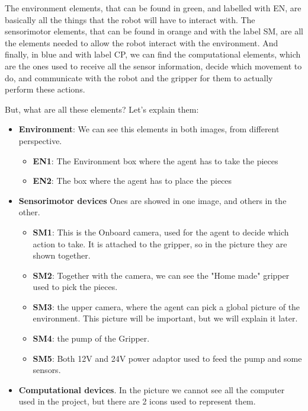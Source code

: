 		
		The environment elements, that can be found in green, and labelled with EN, are basically all the things that the robot will have to interact with. The sensorimotor elements, that can be found in orange and with the label SM, are all the elements needed to allow the robot interact with the environment. And finally, in blue and with label CP, we can find the computational elements, which are the ones used to receive all the sensor information, decide which movement to do, and communicate with the robot and the gripper for them to actually perform these actions.
		
		But, what are all these elements? Let's explain them:
		
		\begin{itemize}
			\item[\textendash]\textbf{Environment}: We can see this elements in both images, from different perspective.
			\begin{itemize}
				\item[\textendash]\textbf{EN1}: The Environment box where the agent has to take the pieces
				\item[\textendash]\textbf{EN2}: The box where the agent has to place the pieces
			\end{itemize}
			\item[\textendash]\textbf{Sensorimotor devices} Ones are showed in one image, and others in the other.
			\begin{itemize}
				\item[\textendash]\textbf{SM1}: This is the Onboard camera, used for the agent to decide which action to take. It is attached to the gripper, so in the picture they are shown together.
				\item[\textendash]\textbf{SM2}: Together with the camera, we can see the "Home made" gripper used to pick the pieces.
				\item[\textendash]\textbf{SM3}: the upper camera, where the agent can pick a global picture of the environment. This picture will be important, but we will explain it later.
				\item[\textendash]\textbf{SM4}: the pump of the Gripper.
				\item[\textendash]\textbf{SM5}: Both 12V and 24V power adaptor used to feed the pump and some sensors.
			\end{itemize}
			\item[\textendash]\textbf{Computational devices}. In the picture we cannot see all the computer used in the project, but there are 2 icons used to represent  them.

\end{itemize}
